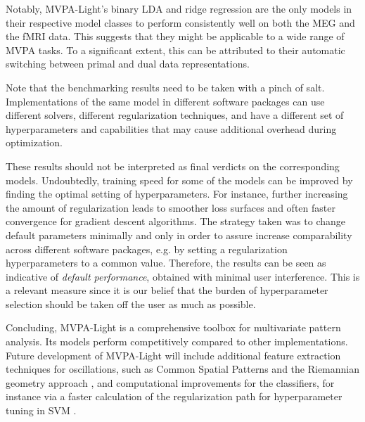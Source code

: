 \documentclass[utf8]{frontiersSCNS} %
\newcommand{\ttt}[1]{\texttt{#1}}
\begin{document}
Notably, MVPA-Light's binary LDA and ridge regression are the only models in their respective model classes to perform consistently well on both the MEG and the fMRI data. This suggests that they might be applicable to a wide range of MVPA tasks. To a significant extent, this can be attributed to their automatic switching between primal and dual data representations.


Note that the benchmarking results need to be taken with a pinch of salt. Implementations of the same model in different software packages can use different solvers, different regularization techniques, and have a different set of hyperparameters and capabilities that may cause additional overhead during optimization.

These results should not be interpreted as final verdicts on the corresponding models. Undoubtedly, training speed for some of the models can be improved by finding the optimal setting of hyperparameters. For instance, further increasing the amount of regularization leads to smoother loss surfaces and often faster convergence for gradient descent algorithms. The strategy taken was to change default parameters minimally and only in order to assure increase comparability across different software packages, e.g. by setting a regularization hyperparameters to a common value. Therefore, the results can be seen as indicative of \textit{default performance}, obtained with minimal user interference. This is a relevant measure since it is our belief that the burden of hyperparameter selection should be taken off the user as much as possible.


Concluding, MVPA-Light is a comprehensive toolbox for multivariate pattern analysis. Its models perform competitively compared to other implementations. Future development of MVPA-Light will include additional feature extraction techniques for oscillations, such as Common Spatial Patterns \citep{Blankertz2008a} and the Riemannian geometry approach \citep{Barachant2013}, and computational improvements for the classifiers, for instance via a faster calculation of the regularization path for hyperparameter tuning in SVM \citep{Hastie2004TheMachine}.
\end{document}
